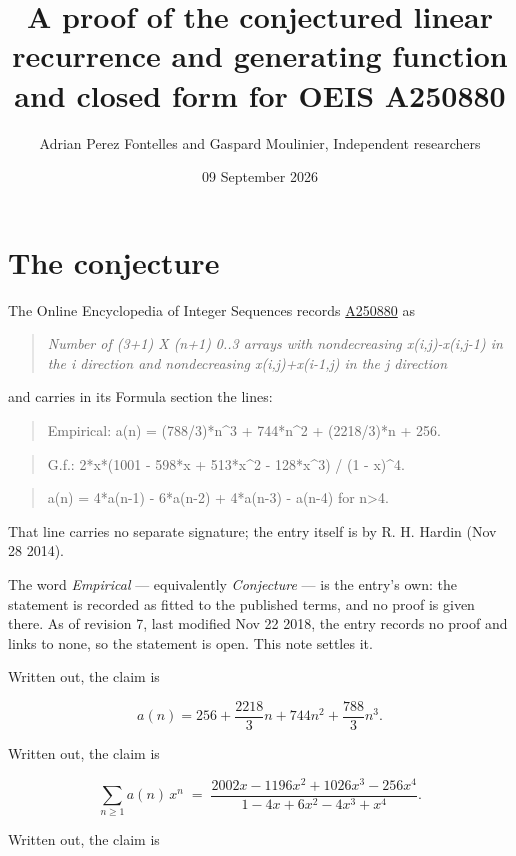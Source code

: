 \documentclass[11pt]{article}
\title{A proof of the conjectured linear recurrence and generating function and closed form for OEIS A250880}
\author{Adrian Perez Fontelles and Gaspard Moulinier, Independent researchers}
\date{09 September 2026}
\theoremstyle{definition}
\begin{document}
\maketitle
\section{The conjecture}

The Online Encyclopedia of Integer Sequences records \href{https://oeis.org/A250880}{A250880} as

\begin{quote}\itshape Number of (3+1) X (n+1) 0..3 arrays with nondecreasing x(i,j)-x(i,j-1) in the i direction and nondecreasing x(i,j)+x(i-1,j) in the j direction\end{quote}

and carries in its Formula section the lines:

\begin{quote}\ttfamily Empirical: a(n) = (788/3)*n\textasciicircum{}3 + 744*n\textasciicircum{}2 + (2218/3)*n + 256.\end{quote}

\begin{quote}\ttfamily G.f.: 2*x*(1001 - 598*x + 513*x\textasciicircum{}2 - 128*x\textasciicircum{}3) / (1 - x)\textasciicircum{}4.\end{quote}

\begin{quote}\ttfamily a(n) = 4*a(n-1) - 6*a(n-2) + 4*a(n-3) - a(n-4) for n>4.\end{quote}

That line carries no separate signature; the entry itself is by R. H. Hardin (Nov 28 2014).

The word {\itshape Empirical} --- equivalently {\itshape Conjecture} --- is the entry's own: the statement is recorded as fitted to the published terms, and no proof is given there. As of revision 7, last modified Nov 22 2018, the entry records no proof and links to none, so the statement is open. This note settles it.

Written out, the claim is

\[a(n) = 256 + \frac{2218}{3}n + 744n^{2} + \frac{788}{3}n^{3}.\]

Written out, the claim is

\[\sum_{n \ge 1} a(n)\,x^n \;=\; \frac{2002x - 1196x^{2} + 1026x^{3} - 256x^{4}}{1 - 4x + 6x^{2} - 4x^{3} + x^{4}}.\]

Written out, the claim is
\end{document}
